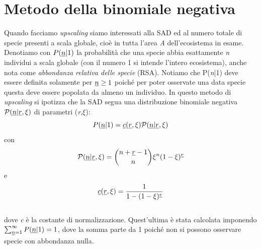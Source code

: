 \section{Metodo della binomiale negativa}
Quando facciamo\emph{ upscaling} siamo interessati alla SAD ed al numero totale di specie presenti a scala globale, cioè in tutta l'area \emph{A} dell'ecosistema in esame.
Denotiamo con $P(\emph{n}|1)$ la probabilità che una specie abbia esattamente \emph{n} individui a scala globale (con il numero 1 si intende l'intero ecosistema), anche nota come \emph{abbondanza relativa delle specie} (RSA).
Notiamo che P(\emph{n}|1) deve essere definita solamente per $\emph{n}\ge1$ poiché per poter osservate una data specie questa deve essere popolata da almeno un individuo.\newline
In questo metodo di \emph{upscaling} si ipotizza che la SAD segua una distribuzione binomiale negativa $\mathcal{P}(\emph{n}|\emph{r},\xi)$ di parametri (\emph{r},$\xi$):
\\ 
\begin{equation}
 P(\emph{n}|1)=\emph{c}(\emph{r},\xi)\mathcal{P}(\emph{n}|\emph{r},\xi)
 \label{eq:NBfunctform}
\end{equation}
con 
\begin{equation}
    \mathcal{P}(\emph{n}|\emph{r},\xi)=\binom{n+\emph{r}-1}{n}\xi^n(1-\xi)^{\emph{r}}     
\end{equation}
e
\begin{equation}
     \emph{c}(\emph{r},\xi)=\frac{1}{1-(1-\xi)^{\emph{r}}}
\end{equation}
\\ 
dove \emph{c} è la costante di normalizzazione.
Quest'ultima è stata calcolata imponendo \newline  $\sum_{\emph{n}=1}^\infty P(\emph{n}|1)=1$, dove la somma parte da 1 poiché  non si possono osservare specie con abbondanza nulla.
